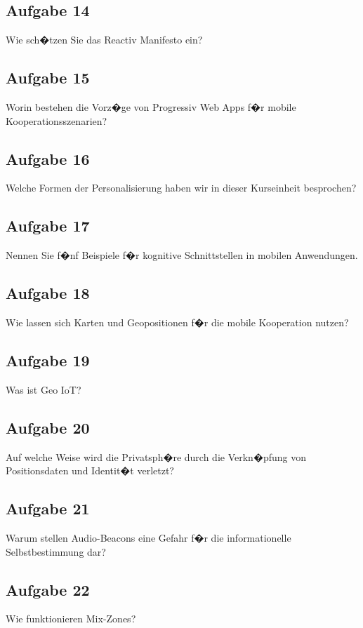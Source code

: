 \subsection*{Aufgabe 14} 
Wie sch�tzen Sie das Reactiv Manifesto ein?

\subsection*{Aufgabe 15} 
Worin bestehen die Vorz�ge von Progressiv Web Apps f�r mobile Kooperationsszenarien?

\subsection*{Aufgabe 16} 
Welche Formen der Personalisierung haben wir in dieser Kurseinheit besprochen?

\subsection*{Aufgabe 17} 
Nennen Sie f�nf Beispiele f�r kognitive Schnittstellen in mobilen Anwendungen.

\subsection*{Aufgabe 18} 
Wie lassen sich Karten und Geopositionen f�r die mobile Kooperation nutzen?

\subsection*{Aufgabe 19} 
Was ist Geo IoT?

\subsection*{Aufgabe 20} 
Auf welche Weise wird die Privatsph�re durch die Verkn�pfung von Positionsdaten und Identit�t verletzt?

\subsection*{Aufgabe 21} 
Warum stellen Audio-Beacons eine Gefahr f�r die informationelle Selbstbestimmung dar?

\subsection*{Aufgabe 22} 
Wie funktionieren Mix-Zones?

